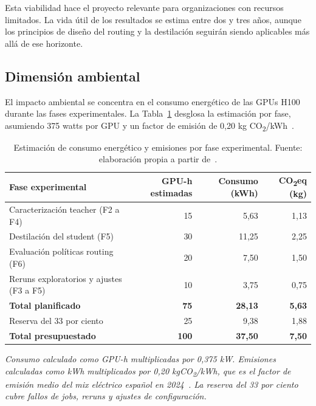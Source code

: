 \documentclass[11pt,a4paper]{article}
\begin{document}
Esta viabilidad hace el proyecto relevante para organizaciones con recursos limitados. La vida útil de los resultados se estima entre dos y tres años, aunque los principios de diseño del routing y la destilación seguirán siendo aplicables más allá de ese horizonte.

\subsection{Dimensión ambiental}

El impacto ambiental se concentra en el consumo energético de las GPUs H100 durante las fases experimentales. La Tabla~\ref{tab:consumo-fase} desglosa la estimación por fase, asumiendo 375 watts por GPU y un factor de emisión de 0,20 kg CO\textsubscript{2}/kWh~\cite{ree2024}.

\begin{table}[H]
\centering
\caption{Estimación de consumo energético y emisiones por fase experimental. Fuente: elaboración propia a partir de~\cite{ree2024}.}
\label{tab:consumo-fase}
\footnotesize
\begin{tabular}{l r r r}
\toprule
\textbf{Fase experimental} & \textbf{GPU-h estimadas} & \textbf{Consumo (kWh)} & \textbf{CO\textsubscript{2}eq (kg)} \\
\midrule
Caracterización teacher (F2 a F4)         & 15 & 5,63  & 1,13 \\
Destilación del student (F5)              & 30 & 11,25 & 2,25 \\
Evaluación políticas routing (F6)         & 20 & 7,50  & 1,50 \\
Reruns exploratorios y ajustes (F3 a F5)  & 10 & 3,75  & 0,75 \\
\midrule
\textbf{Total planificado}                & \textbf{75} & \textbf{28,13} & \textbf{5,63} \\
\addlinespace[2pt]
Reserva del 33 por ciento                & 25 & 9,38  & 1,88 \\
\midrule
\textbf{Total presupuestado}              & \textbf{100} & \textbf{37,50} & \textbf{7,50} \\
\bottomrule
\end{tabular}
\end{table}

\noindent\textit{\scriptsize Consumo calculado como GPU-h multiplicadas por 0,375 kW. Emisiones calculadas como kWh multiplicados por 0,20 kgCO\textsubscript{2}/kWh, que es el factor de emisión medio del mix eléctrico español en 2024~\cite{ree2024}. La reserva del 33 por ciento cubre fallos de jobs, reruns y ajustes de configuración.}
\end{document}
